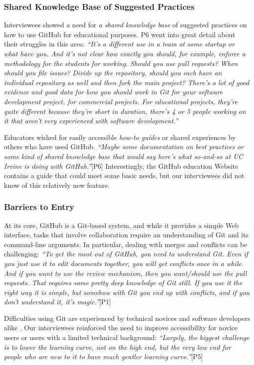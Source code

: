 \subsubsection{Shared Knowledge Base of Suggested Practices}
Interviewees showed a need for \textit{a shared knowledge base} of suggested practices on how to use GitHub for educational purposes. P6 went into great detail about their struggles in this area: \textit{``It's a different use in a team at some startup or what have you. And it's not clear how exactly you should, for example, enforce a methodology for the students for working. Should you use pull requests? When should you file issues? Divide up the repository, should you each have an individual repository as well and then fork the main project? There's a lot of good evidence and good data for how you should work in Git for your software development project, for commercial projects. For educational projects, they're quite different because they're short in duration, there's 4 or 5 people working on it that aren't very experienced with software development.''}

Educators wished for easily accessible \textit{how-to guides} or shared experiences by others who have used GitHub. \textit{``Maybe some documentation on best practices or some kind of shared knowledge base that would say here's what so-and-so at UC Irvine is doing with GitHub.''}[P6]
Interestingly, the GitHub education Website contains a guide that could meet some basic needs, but our interviewees did not know of this relatively new feature.


\subsubsection{Barriers to Entry}
At its core, GitHub is a Git-based system, and while it provides a simple Web interface, tasks that involve collaboration require an understanding of Git and its command-line arguments. In particular, dealing with merges and conflicts can be challenging: \textit{``To get the most out of GitHub, you need to understand Git. Even if you just use it to edit documents together, you will get conflicts once in a while. And if you want to use the review mechanism, then you want/should use the pull requests. That requires some pretty deep knowledge of Git still. If you use it the right way it is simple, but somehow with Git you end up with conflicts, and if you don't understand it, it's magic.''}[P1]

Difficulties using Git are experienced by technical novices and software developers alike \cite{perez2013s}. Our interviewees reinforced the need to improve accessibility for novice users or users with a limited technical background: \textit{``Largely, the biggest challenge is to lower the learning curve, not on the high end, but the very low end for people who are new to it to have much gentler learning curve.''}[P5]

